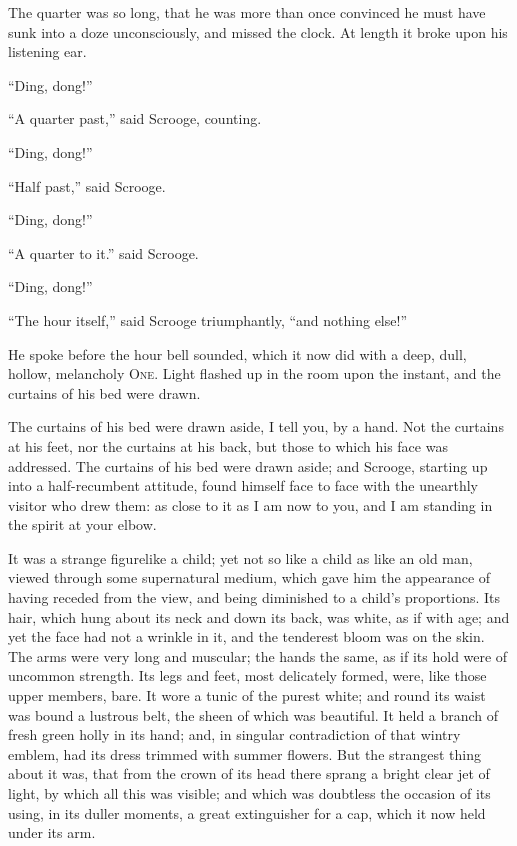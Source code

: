 \documentclass[paper=5.5in:8.5in,BCOR=10mm,twoside,DIV=15,12pt,usegeometry,openany]{scrbook} %
\begin{document}
The quarter was so long, that he was more than once convinced he must have sunk into a doze unconsciously, and missed the clock. At length it broke upon his listening ear.

\enquote{Ding, dong!}

\enquote{A quarter past,} said Scrooge, counting.

\enquote{Ding, dong!}

\enquote{Half past,} said Scrooge.

\enquote{Ding, dong!}

\enquote{A quarter to it.} said Scrooge.

\enquote{Ding, dong!}

\enquote{The hour itself,} said Scrooge triumphantly, \enquote{and nothing else!}

He spoke before the hour bell sounded, which it now did with a deep, dull, hollow, melancholy \textsc{One}. Light flashed up in the room upon the instant, and the curtains of his bed were drawn.

The curtains of his bed were drawn aside, I tell you, by a hand. Not the curtains at his feet, nor the curtains at his back, but those to which his face was addressed. The curtains of his bed were drawn aside; and Scrooge, starting up into a half-recumbent attitude, found himself face to face with the unearthly visitor who drew them: as close to it as I am now to you, and I am standing in the spirit at your elbow.

It was a strange figure\textemdash like a child; yet not so like a child as like an old man, viewed through some supernatural medium, which gave him the appearance of having receded from the view, and being diminished to a child's proportions. Its hair, which hung about its neck and down its back, was white, as if with age; and yet the face had not a wrinkle in it, and the tenderest bloom was on the skin. The arms were very long and muscular; the hands the same, as if its hold were of uncommon strength. Its legs and feet, most delicately formed, were, like those upper members, bare. It wore a tunic of the purest white; and round its waist was bound a lustrous belt, the sheen of which was beautiful. It held a branch of fresh green holly in its hand; and, in singular contradiction of that wintry emblem, had its dress trimmed with summer flowers. But the strangest thing about it was, that from the crown of its head there sprang a bright clear jet of light, by which all this was visible; and which was doubtless the occasion of its using, in its duller moments, a great extinguisher for a cap, which it now held under its arm.
\end{document}
